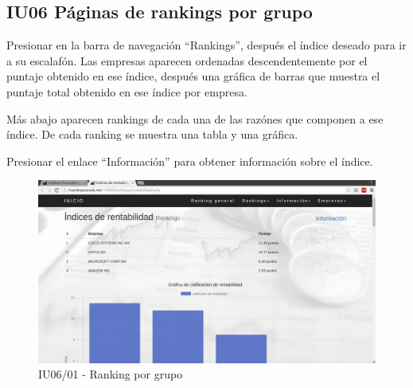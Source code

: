 \hypertarget{IU06}{\subsection{IU06 Páginas de rankings por grupo}}

    Presionar en la barra de navegación ``Rankings'', después el índice deseado
    para ir a su escalafón. Las empresas aparecen ordenadas descendentemente
    por el puntaje obtenido en ese índice, después una gráfica de barras que muestra el
    puntaje total obtenido en ese índice por empresa.

    Más abajo aparecen rankings de cada una de las razónes que componen a ese índice.
    De cada ranking se muestra una tabla y una gráfica.

    Presionar el enlace ``Información'' para obtener información sobre el índice.

    \begin{figure}[H]
        \begin{center}
            \includegraphics[scale=0.3]{pantallas/Rankings1}
            \caption{IU06/01 - Ranking por grupo}
        \end{center}
    \end{figure}
